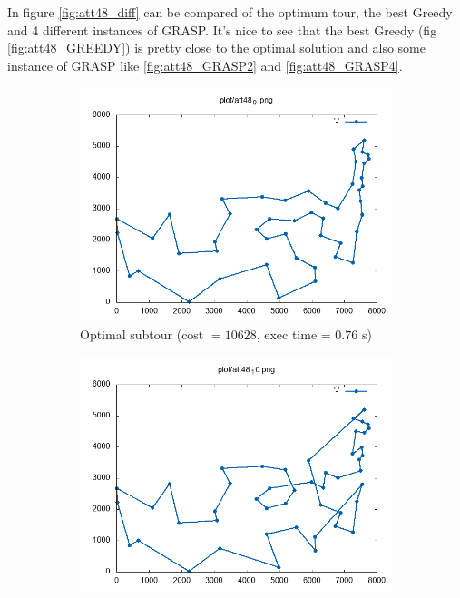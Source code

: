 In figure \ref{fig:att48_diff} can be compared of the optimum tour, the best Greedy and 4 different instances of GRASP. It's nice to see that the best Greedy (fig \ref{fig:att48_GREEDY}) is pretty close to the optimal solution and also some instance of GRASP like \ref{fig:att48_GRASP2} and \ref{fig:att48_GRASP4}.
\begin{figure}[!h]
	\begin{subfigure}{.5\textwidth}
		\centering
		\includegraphics[width=\columnwidth]{../res/att48_0.png}
		\caption{Optimal subtour (cost $ = 10628 $, exec time = $ 0.76 $ s)}
		\label{fig:att48_best}
	\end{subfigure}
	\begin{subfigure}{.5\textwidth}
		\centering
		\includegraphics[width=\columnwidth]{../res/att48_10.png}

\end{subfigure}
\end{figure}
